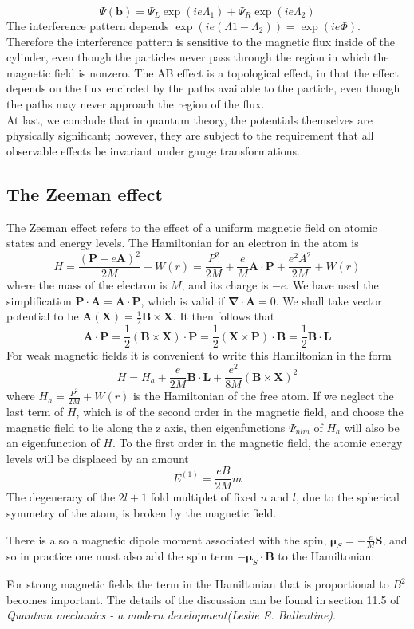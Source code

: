 \documentclass[cyan]{elegantnote}
\begin{document}
\[\Psi(\bm{b}) = \Psi_L\exp(ie\Lambda_1) + \Psi_R\exp(ie\Lambda_2)\]
The interference pattern depends $\exp(ie(\Lambda1-\Lambda_2)) = \exp(ie\Phi)$. 
Therefore the interference pattern is sensitive to the magnetic flux inside of the cylinder, even though the particles never pass through the region in which the magnetic field is nonzero. 
The AB effect is a topological effect, in that the effect depends on the flux encircled by the paths available to the particle, even though the paths may never approach the region of the flux. \\
At last, we conclude that in quantum theory, the potentials themselves are physically significant; however, they are subject to the requirement that all observable effects be invariant under gauge transformations.

\subsection{The Zeeman effect}
The Zeeman effect refers to the effect of a uniform magnetic field on atomic states and energy levels.
The Hamiltonian for an electron in the atom is
\[H = \frac{(\bm{P}+e\bm{A})^2}{2M} + W(r) = \frac{P^2}{2M} + \frac{e}{M}\bm{A}\cdot\bm{P} + \frac{e^2A^2}{2M} + W(r)\]
where the mass of the electron is $M$, and its charge is $-e$. We have used the simplification $\bm{P}\cdot\bm{A} = \bm{A}\cdot\bm{P}$, which is valid if $\bm{\nabla}\cdot\bm{A}=0$. 
We shall take vector potential to be $\bm{A}(\bm{X}) = \frac{1}{2}\bm{B}\times\bm{X}$. It then follows that
\[\bm{A}\cdot\bm{P} = \frac{1}{2}(\bm{B}\times\bm{X})\cdot\bm{P} = \frac{1}{2}(\bm{X}\times\bm{P})\cdot\bm{B} = \frac{1}{2} \bm{B}\cdot\bm{L}\]
For weak magnetic fields it is convenient to write this Hamiltonian in the form
\[H = H_a + \frac{e}{2M} \bm{B}\cdot\bm{L} + \frac{e^2}{8M}(\bm{B}\times\bm{X})^2\]
where $H_a = \frac{P^2}{2M} + W(r)$ is the Hamiltonian of the free atom.
If we neglect the last term of $H$, which is of the second order in the magnetic field, and choose the magnetic field to lie along the z axis, then eigenfunctions $\Psi_{nlm}$ of $H_a$ will also be an eigenfunction of $H$. To the first order in the magnetic field, the atomic energy levels will be displaced by an amount
\[E^{(1)} = \frac{eB}{2M}m\]
The degeneracy of the $2l+1$ fold multiplet of fixed $n$ and $l$, due to the spherical symmetry of the atom, is broken by the magnetic field.
\begin{note}
There is also a magnetic dipole moment associated with the spin, $\bm{\mu}_{S} = -\frac{e}{M}\bm{S}$, and so in practice one must also add the spin term $-\bm{\mu}_{S} \cdot \bm{B}$ to the Hamiltonian.
\end{note}
For strong magnetic fields the term in the Hamiltonian that is proportional to $B^2$ becomes important. The details of the discussion can be found in section 11.5 of \emph{Quantum mechanics - a modern development(Leslie E. Ballentine)}.
\end{document}
